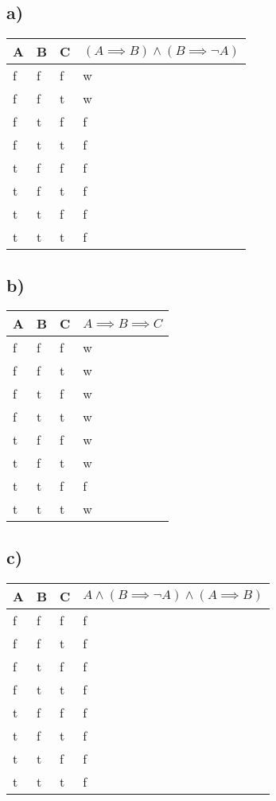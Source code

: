 \documentclass[a4paper,12pt]{article}
\begin{document}
    \subsection*{a)}
    
    \centering
    \begin{tabular}{|l|l|l|l|}
    \hline
    A & B & C & $(A \implies B) \land (B \implies \neg A)$ \\ \hline
    f & f & f & w \\ \hline
    f & f & t & w \\ \hline
    f & t & f & f \\ \hline
    f & t & t & f \\ \hline
    t & f & f & f \\ \hline
    t & f & t & f \\ \hline
    t & t & f & f \\ \hline
    t & t & t & f \\ \hline
    \end{tabular}
    
    \subsection*{b)}
    
    \centering
    \begin{tabular}{|l|l|l|l|}
    \hline
    A & B & C & $A \implies B \implies C$ \\ \hline
    f & f & f & w \\ \hline
    f & f & t & w \\ \hline
    f & t & f & w \\ \hline
    f & t & t & w \\ \hline
    t & f & f & w \\ \hline
    t & f & t & w \\ \hline
    t & t & f & f \\ \hline
    t & t & t & w \\ \hline
    \end{tabular}
    
    \subsection*{c)}
    
    \centering
    \begin{tabular}{|l|l|l|l|}
    \hline
    A & B & C & $A \land (B \implies \neg A) \land (A \implies B)$ \\ \hline
    f & f & f & f \\ \hline
    f & f & t & f \\ \hline
    f & t & f & f \\ \hline
    f & t & t & f \\ \hline
    t & f & f & f \\ \hline
    t & f & t & f \\ \hline
    t & t & f & f \\ \hline
    t & t & t & f \\ \hline
    \end{tabular}
    
\end{document}
